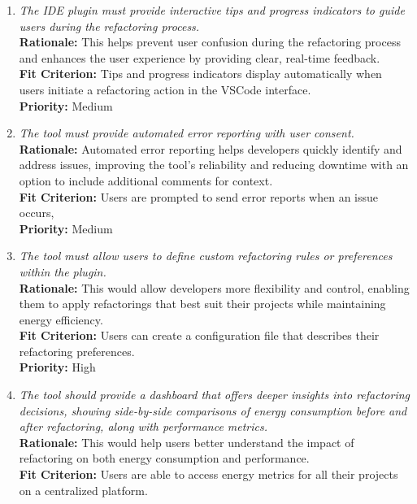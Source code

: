 \documentclass[12pt]{article}
\begin{document}
\begin{enumerate}[label=WTRM \arabic*., wide=0pt, leftmargin=*]
  \item \emph{The IDE plugin must provide interactive tips and
    progress indicators to guide users during the refactoring process.}\\[2mm]
    {\bf Rationale:} This helps prevent user confusion during the
    refactoring process and enhances the user experience by providing
    clear, real-time feedback.\\
    {\bf Fit Criterion:} Tips and progress indicators display
    automatically when users initiate a refactoring action in the
    VSCode interface.\\
    {\bf Priority:} Medium
  \item \emph{The tool must provide automated error reporting with
    user consent.}\\[2mm]
    {\bf Rationale:} Automated error reporting helps developers
    quickly identify and address issues, improving the tool's
    reliability and reducing downtime with an option to include
    additional comments for context.\\
    {\bf Fit Criterion:} Users are prompted to send error reports
    when an issue occurs, \\
    {\bf Priority:} Medium
  \item \emph{The tool must allow users to define custom refactoring
    rules or preferences within the plugin.}\\[2mm]
    {\bf Rationale:} This would allow developers more flexibility and
    control, enabling them to apply refactorings that best suit their
    projects while maintaining energy efficiency.\\
    {\bf Fit Criterion:} Users can create a configuration file that
    describes their refactoring preferences.\\
    {\bf Priority:} High
  \item \emph{The tool should provide a dashboard that offers deeper
      insights into refactoring decisions, showing side-by-side
      comparisons of energy consumption before and after refactoring,
    along with performance metrics.}\\[2mm]
    {\bf Rationale:} This would help users better understand the
    impact of refactoring on both energy consumption and performance.\\
    {\bf Fit Criterion:} Users are able to access energy metrics for
    all their projects on a centralized platform.\\

\end{enumerate}
\end{document}
